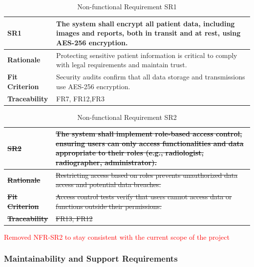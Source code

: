 \documentclass[12pt]{article}
\begin{document}
\begin{table}[h!]
\centering
{}
\begin{tabular}{|p{3.5cm}|p{11.5cm}|}
\hline
\rowcolor{gray!30}
\textbf{SR1} & The system shall encrypt all patient data, including images and reports, both in transit and at rest, using AES-256 encryption. \\
\hline
\textbf{Rationale} & Protecting sensitive patient information is critical to comply with legal requirements and maintain trust. \\
\hline
\textbf{Fit Criterion} & Security audits confirm that all data storage and transmissions use AES-256 encryption. \\
\hline
\textbf{Traceability} & FR7, FR12,FR3 \\
\hline
\end{tabular}
\caption{Non-functional Requirement SR1}
\end{table}

\begin{table}[h!]
\centering
{}
\begin{tabular}{|p{3.5cm}|p{11.5cm}|}
\hline
\rowcolor{gray!30}
\sout{\textbf{SR2}} & \sout{The system shall implement role-based access control, ensuring users can only access functionalities and data appropriate to their roles (e.g., radiologist, radiographer, administrator).} \\
\hline
\sout{\textbf{Rationale}} & \sout{Restricting access based on roles prevents unauthorized data access and potential data breaches.} \\
\hline
\sout{\textbf{Fit Criterion}} & \sout{Access control tests verify that users cannot access data or functions outside their permissions.} \\
\hline
\sout{\textbf{Traceability}} & \sout{FR13, FR12} \\
\hline
\end{tabular}
\caption{Non-functional Requirement SR2}
\textcolor{red}{Removed NFR-SR2 to stay consistent with the current scope of the project}
\end{table}
\newpage
\subsubsection{Maintainability and Support Requirements}
\end{document}
